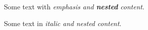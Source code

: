 \documentclass{article}
\begin{document}
Some text with \emph{emphasis and \textbf{nested} content}.

Some text in \textit{italic and \textit{nested} content}.
\end{document}
